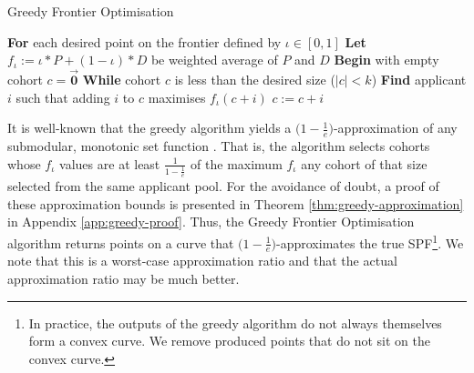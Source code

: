 \begin{algorithm}
    \caption{Greedy Frontier Optimisation}\label{alg:frontier}
    \begin{algorithmic}
    \State \textbf{For} each desired point on the frontier defined by $\iota \in [0, 1]$
    \State \hspace{\algorithmicindent} \textbf{Let} $f_{\iota} := \iota*P+(1-\iota)*D$ be weighted average of $P$ and $D$
    \State \hspace{\algorithmicindent} \textbf{Begin} with empty cohort $c = \vec{\mathbf{0}}$
    \State \hspace{\algorithmicindent} \textbf{While} cohort $c$ is less than the desired size ($|c| < k$)
    \State \hspace{\algorithmicindent} \hspace{\algorithmicindent} \textbf{Find} applicant $i$ such that adding $i$ to $c$ maximises $f_{\iota}(c + i)$
    \State \hspace{\algorithmicindent} \hspace{\algorithmicindent} $c := c + i$
    \end{algorithmic}
\end{algorithm}

It is well-known that the greedy algorithm yields a $\bigl( 1-\frac{1}{e} \bigr)$-approximation of any submodular, monotonic set function \cite{bordeaux_submodular_2014}. That is, the algorithm selects cohorts whose $f_\iota$ values are at least $\frac{1}{1-\frac{1}{e}}$ of the maximum $f_\iota$ any cohort of that size selected from the same applicant pool. For the avoidance of doubt, a proof of these approximation bounds is presented in Theorem \ref{thm:greedy-approximation} in Appendix \ref{app:greedy-proof}. Thus, the Greedy Frontier Optimisation algorithm returns points on a curve that $\bigl( 1-\frac{1}{e} \bigr)$-approximates the true SPF\footnote{In practice, the outputs of the greedy algorithm do not always themselves form a convex curve. We remove produced points that do not sit on the convex curve.}. We note that this is a worst-case approximation ratio and that the actual approximation ratio may be much better.


